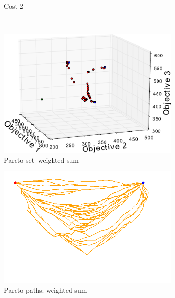 \documentclass{article}
\begin{document}
\begin{figure}[h!]
\begin{subfigure}[b]{0.26\linewidth}
		\caption{Cost 2}
		\label{fig:sim:many:fitness2}
	\end{subfigure}  \\
	\begin{subfigure}[b]{0.35\linewidth}
		\centering
		\includegraphics[width=\textwidth]{fig/sim6-3obj/PF06-MORRT.pdf}
		\caption{Pareto set: weighted sum}
		\label{fig:sim:many:pf:a}
	\end{subfigure}
	\begin{subfigure}[b]{0.35\linewidth}
		\centering
		\includegraphics[width=\textwidth]{fig/sim6-3obj/MORRTstar02-ALL.png}
		\caption{Pareto paths: weighted sum}
		\label{fig:sim:many:sols:a}
	\end{subfigure}  \\
	\begin{subfigure}[b]{0.35\linewidth}
		\centering

\end{subfigure}
\end{figure}
\end{document}
